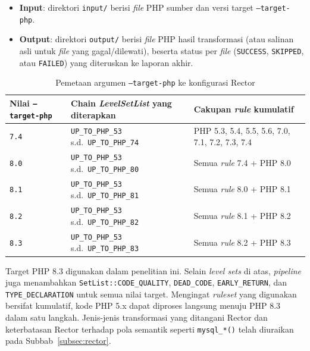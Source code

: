 \begin{itemize}
    \item \textbf{Input}: direktori \texttt{input/} berisi \textit{file} PHP sumber dan versi target \texttt{--target-php}.
    \item \textbf{Output}: direktori \texttt{output/} berisi \textit{file} PHP hasil transformasi (atau salinan asli untuk \textit{file} yang gagal/dilewati), beserta status per \textit{file} (\texttt{SUCCESS}, \texttt{SKIPPED}, atau \texttt{FAILED}) yang diteruskan ke laporan akhir.
\end{itemize}
\begin{table}[htbp]
\caption{Pemetaan argumen \texttt{--target-php} ke konfigurasi Rector}
\vspace{0.5em}
\centering
\label{tab:rector-levelset}
\renewcommand{\arraystretch}{1.4}
\begin{tabularx}{\textwidth}{|l|>{\raggedright\arraybackslash}X|>{\raggedright\arraybackslash}X|}
\hline
\textbf{Nilai \texttt{--target-php}} & \textbf{Chain \textit{LevelSetList} yang diterapkan} & \textbf{Cakupan \textit{rule} kumulatif} \\
\hline \hline

\texttt{7.4} & \texttt{UP\_TO\_PHP\_53} s.d.\ \texttt{UP\_TO\_PHP\_74} & PHP 5.3, 5.4, 5.5, 5.6, 7.0, 7.1, 7.2, 7.3, 7.4 \\
\hline

\texttt{8.0} & \texttt{UP\_TO\_PHP\_53} s.d.\ \texttt{UP\_TO\_PHP\_80} & Semua \textit{rule} 7.4 + PHP 8.0 \\
\hline

\texttt{8.1} & \texttt{UP\_TO\_PHP\_53} s.d.\ \texttt{UP\_TO\_PHP\_81} & Semua \textit{rule} 8.0 + PHP 8.1 \\
\hline

\texttt{8.2} & \texttt{UP\_TO\_PHP\_53} s.d.\ \texttt{UP\_TO\_PHP\_82} & Semua \textit{rule} 8.1 + PHP 8.2 \\
\hline

\texttt{8.3} & \texttt{UP\_TO\_PHP\_53} s.d.\ \texttt{UP\_TO\_PHP\_83} & Semua \textit{rule} 8.2 + PHP 8.3 \\
\hline

\end{tabularx}
\end{table}

Target PHP 8.3 digunakan dalam penelitian ini. Selain 
\textit{level sets} di atas, \textit{pipeline} juga 
menambahkan \texttt{SetList::CODE\_QUALITY}, 
\texttt{DEAD\_CODE}, \texttt{EARLY\_RETURN}, dan 
\texttt{TYPE\_DECLARATION} untuk semua nilai target.
Mengingat \textit{ruleset} yang digunakan bersifat kumulatif, kode PHP 5.x dapat diproses langsung menuju PHP 8.3 dalam satu langkah. 
Jenis-jenis transformasi yang ditangani Rector dan
keterbatasan Rector terhadap pola semantik seperti \texttt{mysql\_*()}
telah diuraikan pada Subbab~\ref{subsec:rector}.
